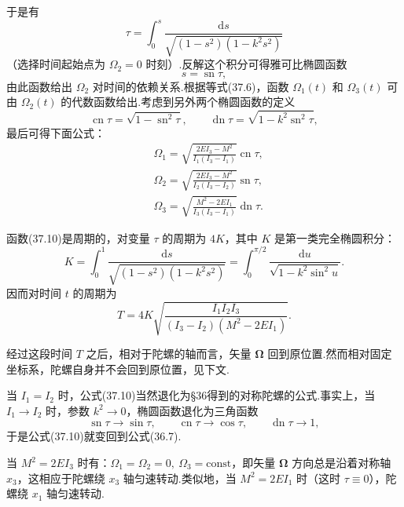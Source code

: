 于是有
\begin{equation*}
  \tau=\int_0^s
  \frac{\mathrm{d}s}{\sqrt{(1-s^2)(1-k^2s^2)}}
\end{equation*}
（选择时间起始点为 $\Omega_2=0$ 时刻）.反解这个积分可得雅可比椭圆函数
\begin{equation*}
  s=\operatorname{sn}\tau,
\end{equation*}
由此函数给出 $\Omega_2$ 对时间的依赖关系.根据等式(37.6)，函数 $\Omega_1(t)$ 和 $\Omega_3(t)$ 可由 $\Omega_2(t)$ 的代数函数给出.考虑到另外两个椭圆函数的定义
\begin{equation*}
  \operatorname{cn}\tau=\sqrt{1-\operatorname{sn}^2\tau},\qquad
  \operatorname{dn}\tau=\sqrt{1-k^2\operatorname{sn}^2\tau},
\end{equation*}
最后可得下面公式：
\begin{equation}
\begin{aligned}
  &\Omega_1=\sqrt{\frac{2EI_3-M^2}{I_1(I_3-I_1)}}\operatorname{cn}\tau,\\
  &\Omega_2=\sqrt{\frac{2EI_3-M^2}{I_2(I_3-I_2)}}\operatorname{sn}\tau,\\
  &\Omega_3=\sqrt{\frac{M^2-2EI_1}{I_3(I_3-I_1)}}\operatorname{dn}\tau.
\end{aligned}
\end{equation}

函数(37.10)是周期的，对变量 $\tau$ 的周期为 $4K$，其中 $K$ 是第一类完全椭圆积分：
\begin{equation}
  K=\int_0^1\frac{\mathrm{d}s}
  {\sqrt{(1-s^2)(1-k^2s^2)}}
  =\int_0^{\pi/2}\frac{\mathrm{d}u}
  {\sqrt{1-k^2\sin^2 u}}.
\end{equation}
因而对时间 $t$ 的周期为
\begin{equation}
  T=4K\sqrt{\frac{I_1I_2I_3}
  {(I_3-I_2)(M^2-2EI_1)}}.
\end{equation}

经过这段时间 $T$ 之后，相对于陀螺的轴而言，矢量 $\boldsymbol{\Omega}$ 回到原位置.然而相对固定坐标系，陀螺自身并不会回到原位置，见下文.

当 $I_1=I_2$ 时，公式(37.10)当然退化为§36得到的对称陀螺的公式.事实上，当 $I_1\to I_2$ 时，参数 $k^2\to0$，椭圆函数退化为三角函数
\begin{equation*}
  \operatorname{sn}\tau\to\sin\tau,\qquad
  \operatorname{cn}\tau\to\cos\tau,\qquad
  \operatorname{dn}\tau\to1,
\end{equation*}
于是公式(37.10)就变回到公式(36.7).

当 $M^2=2EI_3$ 时有：$\Omega_1=\Omega_2=0,\ \Omega_3=\mathrm{const}$，即矢量 $\boldsymbol{\Omega}$ 方向总是沿着对称轴 $x_3$，这相应于陀螺绕 $x_3$ 轴匀速转动.类似地，当 $M^2=2EI_1$ 时（这时 $\tau\equiv0$），陀螺绕 $x_1$ 轴匀速转动.

